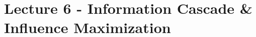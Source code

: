 \section{Lecture 6 - Information Cascade \& Influence Maximization} %
\label{sec:lecture_6_information_cascade_&_influence_maximization}

